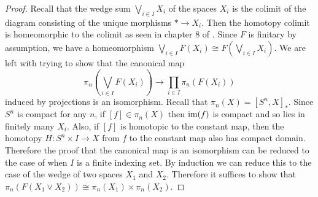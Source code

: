 \begin{thm}
\begin{proof}
Recall that the wedge sum $\bigvee_{i\in I}X_i$ of the spaces $X_i$ is the colimit of the diagram consisting of the unique morphisms $\ast\to X_i$. Then the homotopy colimit is homeomorphic to the colimit as seen in chapter 8 of \cite{CHT}. Since $F$ is finitary by assumption, we have a homeomorphism $\bigvee_{i\in I}F(X_i)\cong F\left(\bigvee_{i\in I}X_i\right)$. We are left with trying to show that the canonical map $$\pi_n\left(\bigvee_{i\in I}F(X_i)\right)\to\prod_{i\in I}\pi_n\left(F(X_i)\right)$$ induced by projections is an isomorphism. Recall that $\pi_n(X)=[S^n,X]_\ast$. Since $S^n$ is compact for any $n$, if $[f]\in\pi_n(X)$ then $\operatorname{im}(f)$ is compact and so lies in finitely many $X_i$. Also, if $[f]$ is homotopic to the constant map, then the homotopy $H:S^n\times I\to X$ from $f$ to the constant map also has compact domain. Therefore the proof that the canonical map is an isomorphism can be reduced to the case of when $I$ is a finite indexing set. By induction we can reduce this to the case of the wedge of two spaces $X_1$ and $X_2$. Therefore it suffices to show that $\pi_n(F(X_1\vee X_2))\cong\pi_n(X_1)\times\pi_n(X_2)$. 


\end{proof}
\end{thm}
